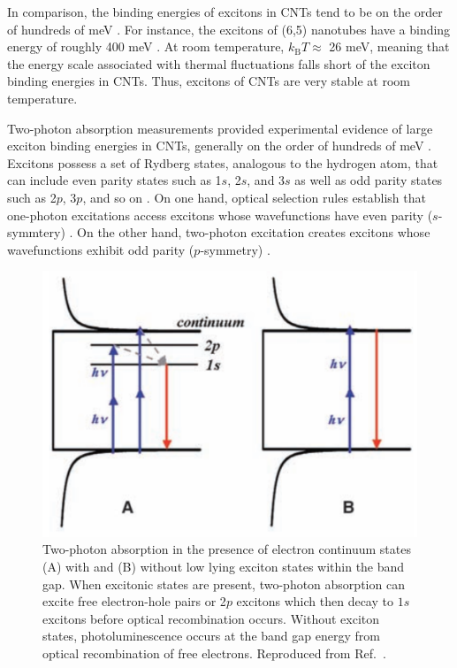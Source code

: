 In comparison, the binding energies of excitons in CNTs tend to be on the order of hundreds of meV \cite{wang2005optical}. For instance, the excitons of (6,5) nanotubes have a binding energy of roughly 400 meV \cite{wang2005optical}. At room temperature, $k_\text{B} T \approx$ 26 meV, meaning that the energy scale associated with thermal fluctuations falls short of the exciton binding energies in CNTs. Thus, excitons of CNTs are very stable at room temperature. %

Two-photon absorption measurements provided experimental evidence of large exciton binding energies in CNTs, generally on the order of hundreds of meV \cite{maultzsch2005exciton, wang2005optical}. Excitons possess a set of Rydberg states, analogous to the hydrogen atom, that can include even parity states such as 1$s$, 2$s$, and 3$s$ as well as odd parity states such as 2$p$, 3$p$, and so on \cite{wang2005optical}. On one hand, optical selection rules establish that one-photon excitations access excitons whose wavefunctions have even parity ($s$-symmtery) \cite{wang2005optical}. On the other hand, two-photon excitation creates excitons whose wavefunctions exhibit odd parity ($p$-symmetry) \cite{wang2005optical}.

\begin{figure}[ht]
	\centering
	\includegraphics[scale=0.3]{images/chapter_optical_props/cnt_two_photon}
	\caption{ Two-photon absorption in the presence of electron continuum states (A) with and (B) without low lying exciton states within the band gap. When excitonic states are present, two-photon absorption can excite free electron-hole pairs or 2$p$ excitons which then decay to $1s$ excitons before optical recombination occurs. Without exciton states, photoluminescence occurs at the band gap energy from optical recombination of free electrons. Reproduced from Ref.\ \cite{wang2005optical}. }
	\label{fig:cnt_two_photon}
\end{figure}

